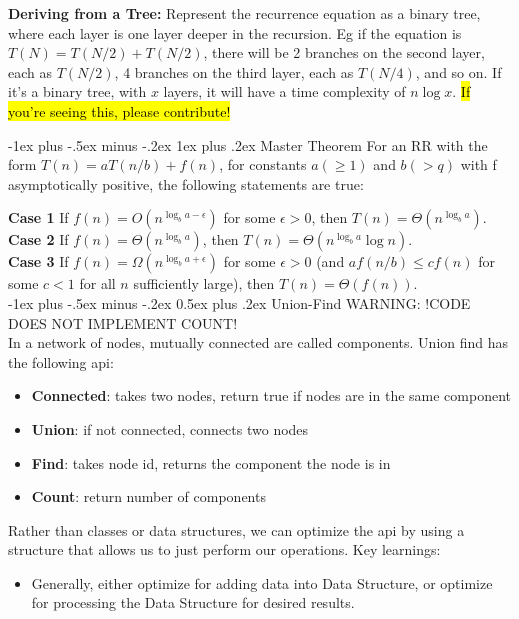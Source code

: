 \documentclass[letterpaper, 8pt]{extarticle}
\makeatletter
\renewcommand{\section}{\@startsection{section}{1}{0mm}%
                                {-1ex plus -.5ex minus -.2ex}%
                                {0.5ex plus .2ex}%
                                {\normalfont\normalsize\bfseries}}
\renewcommand{\subsubsection}{\@startsection{subsubsection}{3}{0mm}%
                                {-1ex plus -.5ex minus -.2ex}%
                                {1ex plus .2ex}%
                                {\normalfont\tiny\bfseries}}
\makeatother
\begin{document}
\begin{multicols*}{4}

  \textbf{Deriving from a Tree:}
  Represent the recurrence equation as a binary tree,
  where each layer is one layer deeper in the recursion.
  Eg if the equation is $T(N) = T(N/2) + T(N/2)$,
  there will be 2 branches on the second layer, each as $T(N/2)$,
  4 branches on the third layer, each as $T(N/4)$, and so on.
  If it's a binary tree, with $x$ layers,
  it will have a time complexity of $n \log x$.
  \hl{If you're seeing this, please contribute!}

  \subsubsection{Master Theorem}
  For an RR with the form $T(n) = aT(n/b) + f(n)$,
  for constants $a(\geq 1)$ and $b(>q)$ with f asymptotically positive,
  the following statements are true:

  \textbf{Case 1} If $f(n) = O(n^{\log_b a-\epsilon})$ for some $\epsilon > 0$, then $T(n) = \Theta(n^{\log_b a})$. \\
  \textbf{Case 2} If $f(n) = \Theta(n^{\log_b a})$, then $T(n) = \Theta(n^{\log_b a} \log n)$. \\
  \textbf{Case 3} If $f(n) = \Omega(n^{\log_b a+\epsilon})$ for some $\epsilon > 0$ (and $af(n/b) \leq c f(n)$ for some $c<1$ for all $n$ sufficiently large), then $T(n) = \Theta(f(n))$. \\

  \section{Union-Find}
  WARNING: !CODE DOES NOT IMPLEMENT COUNT! \\
  In a network of nodes, mutually connected are called components. Union find has the following api:
  \begin{itemize}
    \item \textbf{Connected}: takes two nodes, return true if nodes are in the same component
    \item \textbf{Union}: if not connected, connects two nodes
    \item \textbf{Find}: takes node id, returns the component the node is in
    \item \textbf{Count}: return number of components
  \end{itemize}
  Rather than classes or data structures, we can optimize the api by using a structure that allows us to just perform our operations.
  Key learnings:
  \begin{itemize}
    \item Generally, either optimize for adding data into Data Structure,
          or optimize for processing the Data Structure for desired results.


\end{itemize}
\end{multicols*}
\end{document}
